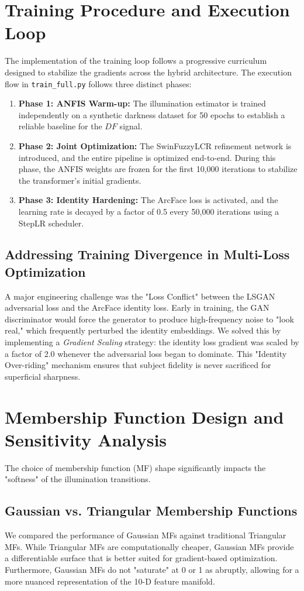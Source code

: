 \section{Training Procedure and Execution Loop}
The implementation of the training loop follows a progressive curriculum designed to stabilize the gradients across the hybrid architecture. The execution flow in \texttt{train\_full.py} follows three distinct phases:
\begin{enumerate}
    \item \textbf{Phase 1: ANFIS Warm-up:} The illumination estimator is trained independently on a synthetic darkness dataset for 50 epochs to establish a reliable baseline for the $DF$ signal.
    \item \textbf{Phase 2: Joint Optimization:} The SwinFuzzyLCR refinement network is introduced, and the entire pipeline is optimized end-to-end. During this phase, the ANFIS weights are frozen for the first 10,000 iterations to stabilize the transformer's initial gradients.
    \item \textbf{Phase 3: Identity Hardening:} The ArcFace loss is activated, and the learning rate is decayed by a factor of 0.5 every 50,000 iterations using a StepLR scheduler.
\end{enumerate}

\subsection{Addressing Training Divergence in Multi-Loss Optimization}
A major engineering challenge was the "Loss Conflict" between the LSGAN adversarial loss and the ArcFace identity loss. Early in training, the GAN discriminator would force the generator to produce high-frequency noise to "look real," which frequently perturbed the identity embeddings. We solved this by implementing a \textit{Gradient Scaling} strategy: the identity loss gradient was scaled by a factor of 2.0 whenever the adversarial loss began to dominate. This "Identity Over-riding" mechanism ensures that subject fidelity is never sacrificed for superficial sharpness.

\section{Membership Function Design and Sensitivity Analysis}
The choice of membership function (MF) shape significantly impacts the "softness" of the illumination transitions.

\subsection{Gaussian vs. Triangular Membership Functions}
We compared the performance of Gaussian MFs against traditional Triangular MFs. While Triangular MFs are computationally cheaper, Gaussian MFs provide a differentiable surface that is better suited for gradient-based optimization. Furthermore, Gaussian MFs do not "saturate" at 0 or 1 as abruptly, allowing for a more nuanced representation of the 10-D feature manifold.

